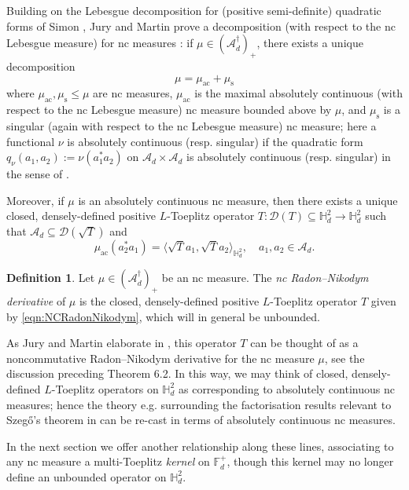 \documentclass[11pt,reqno]{amsart}
\newcommand\ncm[1]{(\mathscr{A}_{#1}^{\dagger})_+}
\def\FF{\mathbb{F}}
\def\HH{\mathbb{H}}
\def\ac{\mathrm{ac}}
\def\rms{\mathrm{s}}
\def\cA{\mathcal{A}}
\def\cD{\mathcal{D}}
\theoremstyle{definition}
\newtheorem{definition}[theorem]{Definition}
\numberwithin{equation}{section}
\begin{document}
Building on the Lebesgue decomposition for (positive semi-definite) quadratic forms of Simon \cite{Sim78}, Jury and Martin prove a decomposition (with respect to the nc Lebesgue measure) for nc measures \cite[Theorem 4]{JM22a}: if \(\mu \in \ncm{d}\), there exists a unique decomposition
\[
    \mu = \mu_{\ac} + \mu_{\rms}
\]
where \(\mu_{\ac}, \mu_{\rms} \leq \mu\) are nc measures, \(\mu_{\ac}\) is the maximal absolutely continuous (with respect to the nc Lebesgue measure) nc measure bounded above by \(\mu\), and \(\mu_\rms\) is a singular (again with respect to the nc Lebesgue measure) nc measure; here a functional \(\nu\) is absolutely continuous (resp. singular) if the quadratic form \(q_\nu(a_1, a_2) := \nu(a_1^* a_2)\) \cite[Equation (4.3)]{JM22a} on \(\cA_d \times \cA_d\) is absolutely continuous (resp. singular) in the sense of \cite{Sim78}.

Moreover, \cite[Theorem 5, Lemma 2]{JM22a} if \(\mu\) is an absolutely continuous nc measure, then there exists a unique closed, densely-defined positive \(L\)-Toeplitz operator \(T : \cD(T) \subseteq \HH^2_d \to \HH^2_d\) such that \(\cA_d \subseteq \cD(\sqrt{T})\) and \cite[Equation (6.1)]{JM22a}
\begin{equation}
    \label{eqn:NCRadonNikodym}
    \mu_{\ac}(a_2^*a_1) = \langle \sqrt{T}a_1, \sqrt{T}a_2 \rangle_{\HH^2_d}, \quad a_1, a_2 \in \cA_d.
\end{equation}
\begin{definition}
    \label{def:NCRadonNikodym}
    Let \(\mu \in \ncm{d}\) be an nc measure. The \emph{nc Radon--Nikodym derivative} of \(\mu\) is the closed, densely-defined positive \(L\)-Toeplitz operator \(T\) given by \eqref{eqn:NCRadonNikodym}, which will in general be unbounded.
\end{definition}

As Jury and Martin elaborate in \cite[Section 6]{JM22a}, this operator \(T\) can be thought of as a noncommutative Radon--Nikodym derivative for the nc measure \(\mu\), see the discussion preceding Theorem 6.2. In this way, we may think of closed, densely-defined \(L\)-Toeplitz operators on \(\HH^2_d\) as corresponding to absolutely continuous nc measures; hence the theory e.g. surrounding the factorisation results relevant to Szeg\H{o}'s theorem in \cite{Pop06} can be re-cast in terms of absolutely continuous nc measures.

In the next section we offer another relationship along these lines, associating to any nc measure a multi-Toeplitz \emph{kernel} on \(\FF_d^+\), though this kernel may no longer define an unbounded operator on \(\HH^2_d\).
\end{document}
